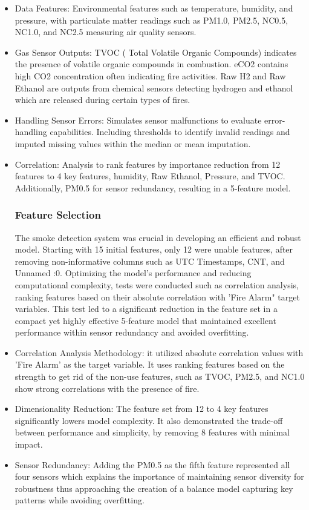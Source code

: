 \documentclass[conference]{IEEEtran}
\begin{document}
\begin{itemize}
\item Data Features: Environmental features such as
temperature, humidity, and pressure, with particulate matter
readings such as PM1.0, PM2.5, NC0.5, NC1.0, and NC2.5
measuring air quality sensors. 
\item Gas Sensor Outputs: TVOC ( Total Volatile Organic
Compounds)  indicates the presence of volatile organic
compounds in combustion. eCO2 contains high CO2
concentration often indicating fire activities. Raw H2 and
Raw Ethanol are outputs from chemical sensors detecting
hydrogen and ethanol which are released during certain types
of fires.  
\item Handling Sensor Errors: Simulates sensor malfunctions
to evaluate error-handling capabilities. Including
thresholds to identify invalid readings and imputed missing
values within the median or mean imputation. 
\item Correlation: Analysis to rank features by importance
reduction from 12 features to 4 key features, humidity, Raw
Ethanol, Pressure, and TVOC. Additionally, PM0.5 for sensor
redundancy, resulting in a 5-feature model.

\subsubsection{Feature Selection}
The smoke detection system was crucial in developing an
efficient and robust model. Starting with 15 initial
features, only 12 were unable features, after removing
non-informative columns such as UTC Timestamps, CNT, and
Unnamed :0. Optimizing the model's performance and reducing
computational complexity, tests were conducted such as
correlation analysis, ranking features based on their
absolute correlation with 'Fire Alarm" target variables.
This test led to a significant reduction in the feature set
in a compact yet highly effective 5-feature model that
maintained excellent performance within sensor redundancy
and avoided overfitting. 
\item Correlation Analysis Methodology: it utilized absolute
correlation values with 'Fire Alarm' as the target variable.
It uses ranking features based on the strength to get rid of
the non-use features, such as TVOC, PM2.5, and NC1.0 show
strong correlations with the presence of fire. 
\item Dimensionality Reduction: The feature set from 12 to 4
key features significantly lowers model complexity. It also
demonstrated the trade-off between performance and
simplicity, by removing 8 features with minimal impact. 
\item Sensor Redundancy: Adding the PM0.5 as the fifth
feature represented all four sensors which explains the
importance of maintaining sensor diversity for robustness
thus approaching the creation of a balance model capturing
key patterns while avoiding overfitting. 
\end{itemize}
\end{document}
